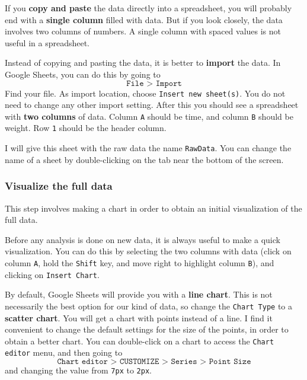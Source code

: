 If you \textbf{copy and paste} the data directly into a spreadsheet, you will probably end with a \textbf{single column} filled with data. But if you look closely, the data involves two columns of numbers. A single column with spaced values is not useful in a spreadsheet.

Instead of copying and pasting the data, it is better to \textbf{import} the data. In Google Sheets, you can do this by going to
\begin{equation}
    \texttt{File > Import}
\end{equation}
Find your file. As import location, choose \texttt{Insert new sheet(s)}. You do not need to change any other import setting. After this you should see a spreadsheet with \textbf{two columns} of data. Column \texttt{A} should be time, and column \texttt{B} should be weight. Row \texttt{1} should be the header column.

I will give this sheet with the raw data the name \texttt{RawData}. You can change the name of a sheet by double-clicking on the tab near the bottom of the screen.
\subsubsection{Visualize the full data}
This step involves making a chart in order to obtain an initial visualization of the full data.

Before any analysis is done on new data, it is always useful to make a quick visualization. You can do this by selecting the two columns with data (click on column \texttt{A}, hold the \texttt{Shift} key, and move right to highlight column \texttt{B}), and clicking on \texttt{Insert Chart}.

By default, Google Sheets will provide you with a \textbf{line chart}. This is not necessarily the best option for our kind of data, so change the \texttt{Chart Type} to a \textbf{scatter chart}. You will get a chart with points instead of a line. I find it convenient to change the default settings for the size of the points, in order to obtain a better chart. You can double-click on a chart to access the \texttt{Chart editor} menu, and then going to
\begin{equation}
    \texttt{Chart editor > CUSTOMIZE > Series > Point Size}
\end{equation}
and changing the value from \texttt{7px} to \texttt{2px}.

